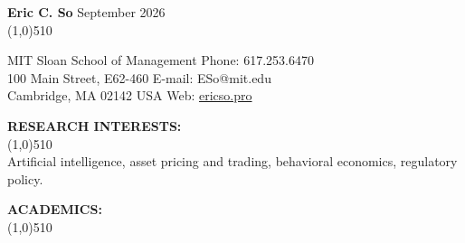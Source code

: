 \documentclass[11pt]{article}
\begin{document}
\setlength{\parindent}{0in}
{\bf \LARGE Eric C. So}  \hfill September 2026\\
\vskip -0.8cm \line(1,0){510} \\ \vskip -0.35cm

MIT Sloan School of Management  \hfill Phone:  617.253.6470\\            
100 Main Street, E62-460    \hfill  E-mail:  ESo@mit.edu\\         
Cambridge, MA  02142 USA \hfill    Web: \href{https://ericso.pro}{ericso.pro}\\
\vskip -0.5cm


\vskip 0.75cm
\setlength{\parindent}{0in}
{\bf RESEARCH INTERESTS:\\}
\vskip -0.85cm \line(1,0){510} \\
\setlength{\parindent}{0.5in}
Artificial intelligence, asset pricing and trading, behavioral economics, regulatory policy.

\vskip 0.75cm
\setlength{\parindent}{0in}
{\bf ACADEMICS:\\}
\vskip -0.85cm \line(1,0){510} \\ \vskip -0.5cm
\end{document}
